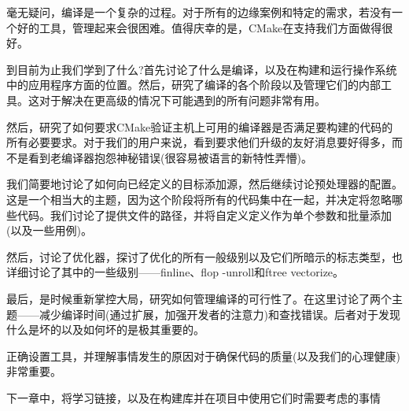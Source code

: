 
毫无疑问，编译是一个复杂的过程。对于所有的边缘案例和特定的需求，若没有一个好的工具，管理起来会很困难。值得庆幸的是，CMake在支持我们方面做得很好。

到目前为止我们学到了什么?首先讨论了什么是编译，以及在构建和运行操作系统中的应用程序方面的位置。然后，研究了编译的各个阶段以及管理它们的内部工具。这对于解决在更高级的情况下可能遇到的所有问题非常有用。

然后，研究了如何要求CMake验证主机上可用的编译器是否满足要构建的代码的所有必要要求。对于我们的用户来说，看到要求他们升级的友好消息要好得多，而不是看到老编译器抱怨神秘错误(很容易被语言的新特性弄懵)。

我们简要地讨论了如何向已经定义的目标添加源，然后继续讨论预处理器的配置。这是一个相当大的主题，因为这个阶段将所有的代码集中在一起，并决定将忽略哪些代码。我们讨论了提供文件的路径，并将自定义定义作为单个参数和批量添加(以及一些用例)。

然后，讨论了优化器，探讨了优化的所有一般级别以及它们所暗示的标志类型，也详细讨论了其中的一些级别——finline、flop -unroll和ftree vectorize。

最后，是时候重新掌控大局，研究如何管理编译的可行性了。在这里讨论了两个主题——减少编译时间(通过扩展，加强开发者的注意力)和查找错误。后者对于发现什么是坏的以及如何坏的是极其重要的。

正确设置工具，并理解事情发生的原因对于确保代码的质量(以及我们的心理健康)非常重要。

下一章中，将学习链接，以及在构建库并在项目中使用它们时需要考虑的事情



